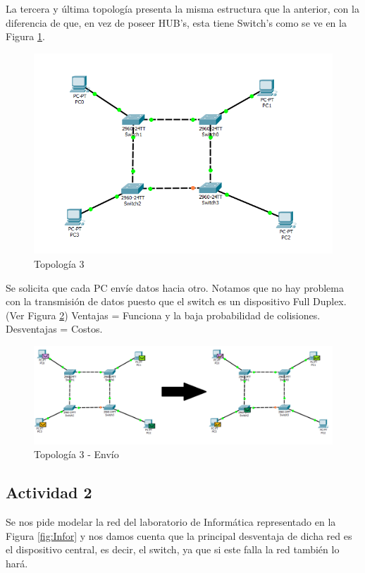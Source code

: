 \documentclass{article}
\begin{document}
\newpage
La tercera y última topología presenta la misma estructura que la anterior, con la diferencia de que, en vez de poseer HUB's, esta tiene Switch's como se ve en la Figura \ref{fig:top3}.

\begin{figure}[h!]
\centering
\includegraphics[scale=0.3]{top3.png}
\caption{Topología 3}
\label{fig:top3}
\end{figure}

Se solicita que cada PC envíe datos hacia otro. Notamos que no hay problema con la transmisión de datos puesto que el switch es un dispositivo Full Duplex. (Ver Figura \ref{fig:topo3})
\newline Ventajas = Funciona y la baja probabilidad de colisiones.
\newline Desventajas = Costos.

\begin{figure}[h!]
\centering
\includegraphics[scale=0.4]{top3,1.png}
\caption{Topología 3 - Envío}
\label{fig:topo3}
\end{figure}

\newpage
\subsection{Actividad 2 \vspace{0.3cm}}
Se nos pide modelar la red del laboratorio de Informática representado en la Figura \ref{fig:Infor} y nos damos cuenta que la principal desventaja de dicha red es el dispositivo central, es decir, el switch, ya que si este falla la red también lo hará.
\end{document}
